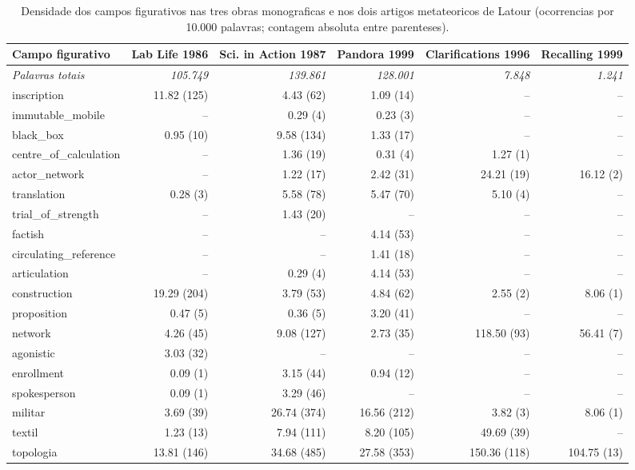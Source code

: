 \begin{table}[htbp]
\centering
\caption{Densidade dos campos figurativos nas tres obras monograficas e nos dois artigos metateoricos de Latour (ocorrencias por 10.000 palavras; contagem absoluta entre parenteses).}
\label{tab:figuracoes_latour_5_obras}
\small
\begin{tabular}{lrrrrr}
\toprule
Campo figurativo & Lab Life 1986 & Sci. in Action 1987 & Pandora 1999 & Clarifications 1996 & Recalling 1999 \\
\midrule
\textit{Palavras totais} & \textit{105.749} & \textit{139.861} & \textit{128.001} & \textit{7.848} & \textit{1.241} \\
\midrule
inscription & 11.82 (125) & 4.43 (62) & 1.09 (14) & -- & -- \\
immutable\_mobile & -- & 0.29 (4) & 0.23 (3) & -- & -- \\
black\_box & 0.95 (10) & 9.58 (134) & 1.33 (17) & -- & -- \\
centre\_of\_calculation & -- & 1.36 (19) & 0.31 (4) & 1.27 (1) & -- \\
actor\_network & -- & 1.22 (17) & 2.42 (31) & 24.21 (19) & 16.12 (2) \\
translation & 0.28 (3) & 5.58 (78) & 5.47 (70) & 5.10 (4) & -- \\
trial\_of\_strength & -- & 1.43 (20) & -- & -- & -- \\
factish & -- & -- & 4.14 (53) & -- & -- \\
circulating\_reference & -- & -- & 1.41 (18) & -- & -- \\
articulation & -- & 0.29 (4) & 4.14 (53) & -- & -- \\
construction & 19.29 (204) & 3.79 (53) & 4.84 (62) & 2.55 (2) & 8.06 (1) \\
proposition & 0.47 (5) & 0.36 (5) & 3.20 (41) & -- & -- \\
network & 4.26 (45) & 9.08 (127) & 2.73 (35) & 118.50 (93) & 56.41 (7) \\
agonistic & 3.03 (32) & -- & -- & -- & -- \\
enrollment & 0.09 (1) & 3.15 (44) & 0.94 (12) & -- & -- \\
spokesperson & 0.09 (1) & 3.29 (46) & -- & -- & -- \\
militar & 3.69 (39) & 26.74 (374) & 16.56 (212) & 3.82 (3) & 8.06 (1) \\
textil & 1.23 (13) & 7.94 (111) & 8.20 (105) & 49.69 (39) & -- \\
topologia & 13.81 (146) & 34.68 (485) & 27.58 (353) & 150.36 (118) & 104.75 (13) \\
\bottomrule
\end{tabular}
\end{table}

